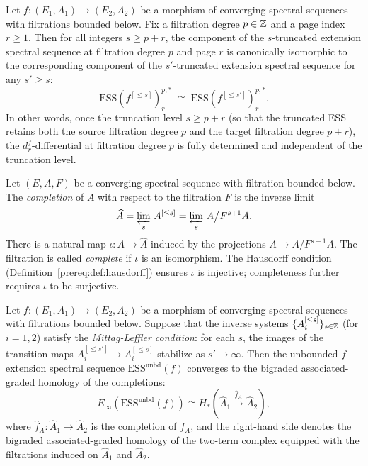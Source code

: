 \begin{proposition}\label{prereq:prop:unbounded-ess-stabilization}
    Let $f: (E_1, A_1) \to (E_2, A_2)$ be a morphism of converging spectral sequences with filtrations bounded below. Fix a filtration degree $p \in {\mathbb Z}$ and a page index $r \ge 1$. Then for all integers $s \ge p + r$, the component of the $s$-truncated extension spectral sequence at filtration degree $p$ and page $r$ is canonically isomorphic to the corresponding component of the $s'$-truncated extension spectral sequence for any $s' \ge s$:
    $$\mathrm{ESS}(f^{[\le s]})_r^{p,*} \;\cong\; \mathrm{ESS}(f^{[\le s']})_r^{p,*}.$$
    In other words, once the truncation level $s \ge p + r$ (so that the truncated ESS retains both the source filtration degree $p$ and the target filtration degree $p + r$), the $d_r^f$-differential at filtration degree $p$ is fully determined and independent of the truncation level.
\end{proposition}

\begin{definition}\label{prereq:def:filtration-completion}
    Let $(E, A, F)$ be a converging spectral sequence with filtration bounded below. The \emph{completion} of $A$ with respect to the filtration $F$ is the inverse limit
    $$\widehat{A} = \varprojlim_{s}\, A^{[\le s]} = \varprojlim_{s}\, A \big/ F^{s+1} A.$$
    There is a natural map $\iota: A \to \widehat{A}$ induced by the projections $A \to A/F^{s+1}A$. The filtration is called \emph{complete} if $\iota$ is an isomorphism. The Hausdorff condition (Definition~\ref{prereq:def:hausdorff}) ensures $\iota$ is injective; completeness further requires $\iota$ to be surjective.
\end{definition}

\begin{theorem}\label{prereq:thm:unbounded-ess-convergence}
    Let $f: (E_1, A_1) \to (E_2, A_2)$ be a morphism of converging spectral sequences with filtrations bounded below. Suppose that the inverse systems $\{A_i^{[\le s]}\}_{s \in {\mathbb Z}}$ (for $i = 1, 2$) satisfy the \emph{Mittag-Leffler condition}: for each $s$, the images of the transition maps $A_i^{[\le s']} \to A_i^{[\le s]}$ stabilize as $s' \to \infty$. Then the unbounded $f$-extension spectral sequence $\mathrm{ESS}^{\mathrm{unbd}}(f)$ converges to the bigraded associated-graded homology of the completions:
    $$E_\infty\!\left(\mathrm{ESS}^{\mathrm{unbd}}(f)\right) \cong H_*\!\left(\widehat{A}_1 \xrightarrow{\hat{f}_A} \widehat{A}_2\right),$$
    where $\hat{f}_A: \widehat{A}_1 \to \widehat{A}_2$ is the completion of $f_A$, and the right-hand side denotes the bigraded associated-graded homology of the two-term complex equipped with the filtrations induced on $\widehat{A}_1$ and $\widehat{A}_2$.
\end{theorem}

